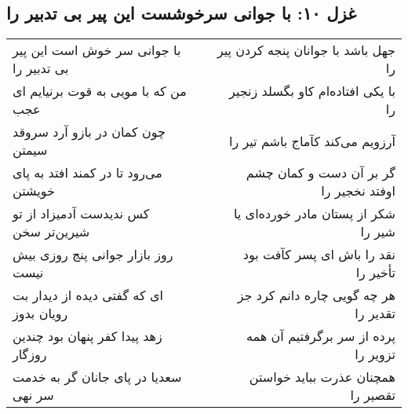 \begin{center}
\section*{غزل ۱۰: با جوانی سرخوشست این پیر بی تدبیر را}
\label{sec:010}
\begin{longtable}{l p{0.5cm} r}
با جوانی سر خوش است این پیر بی تدبیر را
&&
جهل باشد با جوانان پنجه کردن پیر را
\\
من که با مویی به قوت برنیایم ای عجب
&&
با یکی افتاده‌ام کاو بگسلد زنجیر را
\\
چون کمان در بازو آرد سروقد سیمتن
&&
آرزویم می‌کند کآماج باشم تیر را
\\
می‌رود تا در کمند افتد به پای خویشتن
&&
گر بر آن دست و کمان چشم اوفتد نخجیر را
\\
کس ندیدست آدمیزاد از تو شیرین‌تر سخن
&&
شکر از پستان مادر خورده‌ای یا شیر را
\\
روز بازار جوانی پنج روزی بیش نیست
&&
نقد را باش ای پسر کآفت بود تأخیر را
\\
ای که گفتی دیده از دیدار بت رویان بدوز
&&
هر چه گویی چاره دانم کرد جز تقدیر را
\\
زهد پیدا کفر پنهان بود چندین روزگار
&&
پرده از سر برگرفتیم آن همه تزویر را
\\
سعدیا در پای جانان گر به خدمت سر نهی
&&
همچنان عذرت بباید خواستن تقصیر را
\\
\end{longtable}
\end{center}
